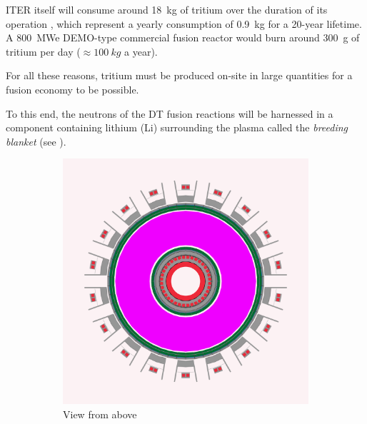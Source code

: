 ITER itself will consume around \SI{18}{kg} of tritium over the duration of its operation , which represent a yearly consumption of \SI{0.9}{kg} for a 20-year lifetime.
A \SI{800}{MWe} DEMO-type commercial fusion reactor would burn around \SI{300}{g} of tritium per day ($\approx \SI{100}{kg}$ a year).

For all these reasons, tritium must be produced on-site in large quantities for a fusion economy to be possible.

To this end, the neutrons of the DT fusion reactions will be harnessed in a component containing lithium (Li) surrounding the plasma called the \textit{breeding blanket} (see ).


\begin{figure}
    \centering
    \begin{subfigure}{0.45\linewidth}
        \includegraphics{Figures/Chapter1/blanket_shimwell_top_view.png}
        \caption{View from above}
    \end{subfigure}%
    \qquad
    \begin{subfigure}{0.45\linewidth}

\end{subfigure}
\end{figure}
